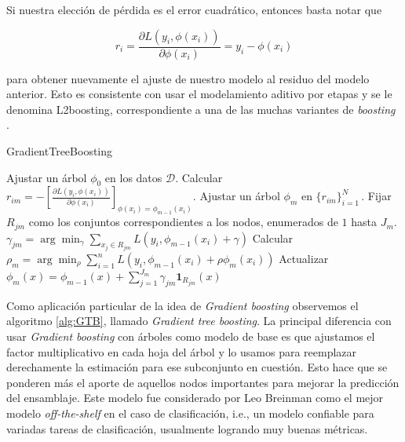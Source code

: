 Si nuestra elección de pérdida es el error cuadrático, entonces basta notar que

$$ r_i = \frac{\partial L(y_i, \phi(x_i))}{\partial \phi(x_i)} = y_i - \phi(x_i) $$

para obtener nuevamente el ajuste de nuestro modelo al residuo del modelo anterior. Esto es consistente con usar el modelamiento aditivo por etapas y se le denomina L2boosting, correspondiente a una de las muchas variantes de \textit{boosting} \cite{ESLbook}.

\begin{algorithm}[H]
\caption{GradientTreeBoosting
\label{alg:GTB}}
    \begin{algorithmic}[1]
        \State Ajustar un árbol $\phi_0$ en los datos $\mathcal{D}$.
            \State Calcular 
            $ r_{im} = - \left[ \frac{\partial L(y_i, \phi(x_i))}{\partial \phi(x_i)} \right]_{\phi(x_i) = \phi_{m-1}(x_i)} . $
            \State Ajustar un árbol $\phi_m$ en $\{r_{im}\}^N_{i=1}$\,.
            \State Fijar $R_{jm}$ como los conjuntos correspondientes a los nodos, enumerados de $1$ hasta $J_m$.
                \State $\gamma_{jm} = \arg\min_\gamma \sum_{x_j \in R_{jm}} L(y_i,\phi_{m-1}(x_i)+\gamma)$
            \EndFor
            \State Calcular $\rho_m = \arg\min_\rho \sum^n_{i=1} L(y_i,\phi_{m-1}(x_i) + \rho \phi_m(x_i))$
            \State Actualizar $\phi_m(x) = \phi_{m-1}(x) + \sum^{J_m}_{j=1} \gamma_{jm} \mathbf{1}_{R_{jm}}(x) $
        \EndFor
    \EndFunction
    \end{algorithmic}
\end{algorithm}

Como aplicación particular de la idea de \textit{Gradient boosting} observemos el algoritmo \ref{alg:GTB}, llamado \textit{Gradient tree boosting}. La principal diferencia con usar \textit{Gradient boosting} con árboles como modelo de base es que ajustamos el factor multiplicativo en cada hoja del árbol y lo usamos para reemplazar derechamente la estimación para ese subconjunto en cuestión. Esto hace que se ponderen más el aporte de aquellos nodos importantes para mejorar la predicción del ensamblaje. Este modelo fue considerado por Leo Breinman como el mejor modelo \textit{off-the-shelf} en el caso de clasificación, i.e., un modelo confiable para variadas tareas de clasificación, usualmente logrando muy buenas métricas.


